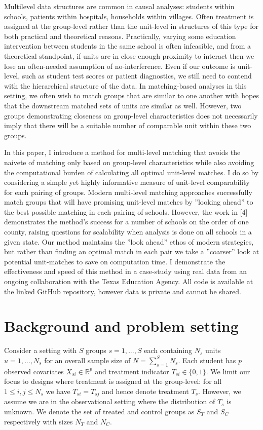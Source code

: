 \documentclass[aoas]{imsart}
\theoremstyle{plain}
\theoremstyle{definition}
\begin{document}
Multilevel data structures are common in causal analyses: students within schools, patients within hospitals,
households within villages. Often treatment is assigned at the group-level rather than the unit-level in structures of this type for both practical and theoretical reasons. Practically, varying some education intervention
between students in the same school is often infeasible, and from a theoretical standpoint, if units are in
close enough proximity to interact then we lose an often-needed assumption of no-interference. Even if our
outcome is unit-level, such as student test scores or patient diagnostics, we still need to contend with the
hierarchical structure of the data. In matching-based analyses in this setting, we often wish to match groups
that are similar to one another with hopes that the downstream matched sets of units are similar as well.
However, two groups demonstrating closeness on group-level characteristics does not necessarily imply that
there will be a suitable number of comparable unit within these two groups. 

In this paper, I introduce a method for multi-level matching that avoids the naivete of matching only
based on group-level characteristics while also avoiding the computational burden of calculating all optimal
unit-level matches. I do so by considering a simple yet highly informative measure of unit-level comparability
for each pairing of groups. Modern multi-level matching approaches successfully match groups that will have
promising unit-level matches by ”looking ahead” to the best possible matching in each pairing of schools.
However, the work in [4] demonstrates the method's success for a number of schools on the order of one county, raising questions for scalability when analysis is done on all schools in a given state.
Our method
maintains the ”look ahead” ethos of modern strategies, but rather than finding an optimal match in each
pair we take a ”coarser” look at potential unit-matches to save on computation time. I demonstrate the
effectiveness and speed of this method in a case-study using real data from an ongoing collaboration with
the Texas Education Agency. All code is available at the linked GitHub repository, however data is private
and cannot be shared.

\section{Background and problem setting}
Consider a setting with $S$ groups $s = 1, ..., S$ each containing $N_s$ units $u = 1, ..., N_s$ for an overall sample size of $N = \sum_{s=1}^{S} N_s$. Each student has $p$ observed covariates $X_{si} \in \mathbb{R}^{p}$ and treatment indicator $T_{si} \in \{0, 1\}$. We limit our focus to designs where treatment is assigned at the group-level: for all $1 \leq i,j \leq N_s$ we have $T_{si} = T_{sj}$ and hence denote treatment $T_s$. However, we assume we are in the observational setting where the distribution of $T_s$ is unknown. We denote the set of treated and control groups as $S_T$ and $S_C$ respectively with sizes $N_T$ and $N_C$. 
\end{document}
